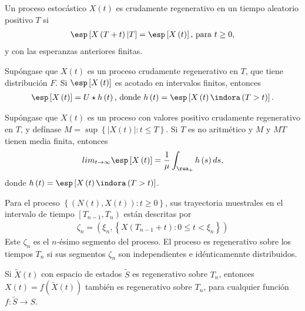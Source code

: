 \begin{Def}
Un proceso estoc\'astico $X\left(t\right)$ es crudamente regenerativo en un tiempo aleatorio positivo $T$ si
\begin{eqnarray*}
\esp\left[X\left(T+t\right)|T\right]=\esp\left[X\left(t\right)\right]\textrm{, para }t\geq0,\end{eqnarray*}
y con las esperanzas anteriores finitas.
\end{Def}

\begin{Prop}
Sup\'ongase que $X\left(t\right)$ es un proceso crudamente regenerativo en $T$, que tiene distribuci\'on $F$. Si $\esp\left[X\left(t\right)\right]$ es acotado en intervalos finitos, entonces
\begin{eqnarray*}
\esp\left[X\left(t\right)\right]=U\star h\left(t\right)\textrm{,  donde }h\left(t\right)=\esp\left[X\left(t\right)\indora\left(T>t\right)\right].
\end{eqnarray*}
\end{Prop}

\begin{Teo}
Sup\'ongase que $X\left(t\right)$ es un proceso con valores positivo crudamente regenerativo en $T$, y def\'inase $M=\sup\left\{|X\left(t\right)|:t\leq T\right\}$. Si $T$ es no aritm\'etico y $M$ y $MT$ tienen media finita, entonces
\begin{eqnarray*}
lim_{t\rightarrow\infty}\esp\left[X\left(t\right)\right]=\frac{1}{\mu}\int_{\rea_{+}}h\left(s\right)ds,
\end{eqnarray*}
donde $h\left(t\right)=\esp\left[X\left(t\right)\indora\left(T>t\right)\right]$.
\end{Teo}

\begin{Def}
Para el proceso $\left\{\left(N\left(t\right),X\left(t\right)\right):t\geq0\right\}$, sus trayectoria muestrales en el intervalo de tiempo $\left[T_{n-1},T_{n}\right)$ est\'an descritas por
\begin{eqnarray*}
\zeta_{n}=\left(\xi_{n},\left\{X\left(T_{n-1}+t\right):0\leq t<\xi_{n}\right\}\right)
\end{eqnarray*}
Este $\zeta_{n}$ es el $n$-\'esimo segmento del proceso. El proceso es regenerativo sobre los tiempos $T_{n}$ si sus segmentos $\zeta_{n}$ son independientes e id\'enticamennte distribuidos.
\end{Def}


\begin{Note}
Si $\tilde{X}\left(t\right)$ con espacio de estados $\tilde{S}$ es regenerativo sobre $T_{n}$, entonces $X\left(t\right)=f\left(\tilde{X}\left(t\right)\right)$ tambi\'en es regenerativo sobre $T_{n}$, para cualquier funci\'on $f:\tilde{S}\rightarrow S$.
\end{Note}

